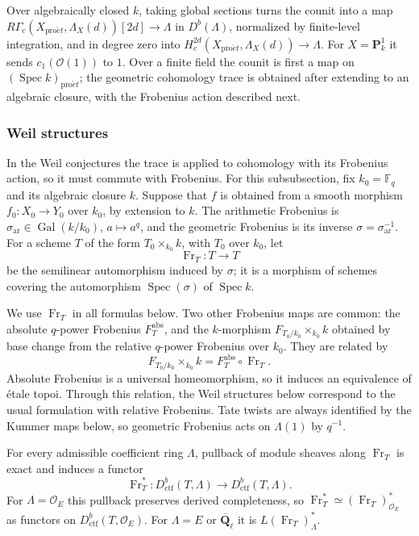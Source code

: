 \documentclass[11pt,a4paper]{article}
\numberwithin{equation}{section}
\theoremstyle{definition}
\theoremstyle{remark}
\newcommand{\Qbar}{\overline{\mathbf Q}_\ell}
\newcommand{\proet}{\mathrm{pro}\acute{e}t}
\newcommand{\Dctf}{D^b_{\mathrm{ctf}}}
\begin{document}
Over algebraically closed $k$, taking global sections turns the counit
into a map
$R\Gamma_c(X_{\proet},\Lambda_X(d))[2d]\to\Lambda$ in $D^b(\Lambda)$,
normalized by finite-level integration, and in degree zero into
$H_c^{2d}(X_{\proet},\Lambda_X(d))\to\Lambda$.
For $X=\mathbf P^1_k$ it sends $c_1(\mathcal O(1))$ to $1$.
Over a finite field the counit is first a map on
$(\operatorname{Spec}k)_{\proet}$; the geometric cohomology trace is
obtained after extending to an algebraic closure, with the Frobenius
action described next.

\subsubsection{Weil structures}

In the Weil conjectures the trace is applied to cohomology with its
Frobenius action, so it must commute with Frobenius. For this
subsubsection, fix $k_0=\mathbb F_q$ and its algebraic closure $k$.
Suppose that $f$ is obtained from a smooth morphism
$f_0:X_0\to Y_0$ over $k_0$, by extension to $k$. The arithmetic Frobenius is
$\sigma_{\mathrm{ar}}\in\operatorname{Gal}(k/k_0)$, $a\mapsto a^q$, and
the geometric Frobenius is its inverse
$\sigma=\sigma_{\mathrm{ar}}^{-1}$. For a scheme $T$ of the form
$T_0\times_{k_0}k$, with $T_0$ over $k_0$, let
\[
 \operatorname{Fr}_T:T\longrightarrow T
\]
be the semilinear automorphism induced by $\sigma$; it is a morphism of
schemes covering the automorphism $\operatorname{Spec}(\sigma)$ of
$\operatorname{Spec}k$.

We use $\operatorname{Fr}_T$ in all formulas below. Two other
Frobenius maps are common: the absolute $q$-power Frobenius
$F_T^{\mathrm{abs}}$, and the $k$-morphism $F_{T_0/k_0}\times_{k_0}k$
obtained by base change from the relative $q$-power Frobenius over $k_0$.
They are related by
\[
 F_{T_0/k_0}\times_{k_0}k
 =F_T^{\mathrm{abs}}\circ\operatorname{Fr}_T .
\]
Absolute Frobenius is a universal homeomorphism, so it induces an
equivalence of \'etale topoi. Through this relation, the Weil
structures below correspond to the usual formulation with relative
Frobenius. Tate
twists are always identified by the Kummer maps below, so geometric
Frobenius acts on $\Lambda(1)$ by $q^{-1}$.

For every admissible coefficient ring $\Lambda$, pullback of module
sheaves along $\operatorname{Fr}_T$ is exact and induces a functor
\[
 \operatorname{Fr}_T^*:
 \Dctf(T,\Lambda)\longrightarrow
 \Dctf(T,\Lambda).
\]
For $\Lambda=\mathcal O_E$ this pullback preserves derived completeness,
so
$\operatorname{Fr}_T^*
 \simeq (\operatorname{Fr}_T)_{\mathcal O_E}^{*}$ as functors on
$\Dctf(T,\mathcal O_E)$.
For $\Lambda=E$ or $\Qbar$ it is $L(\operatorname{Fr}_T)_\Lambda^*$.
\end{document}
